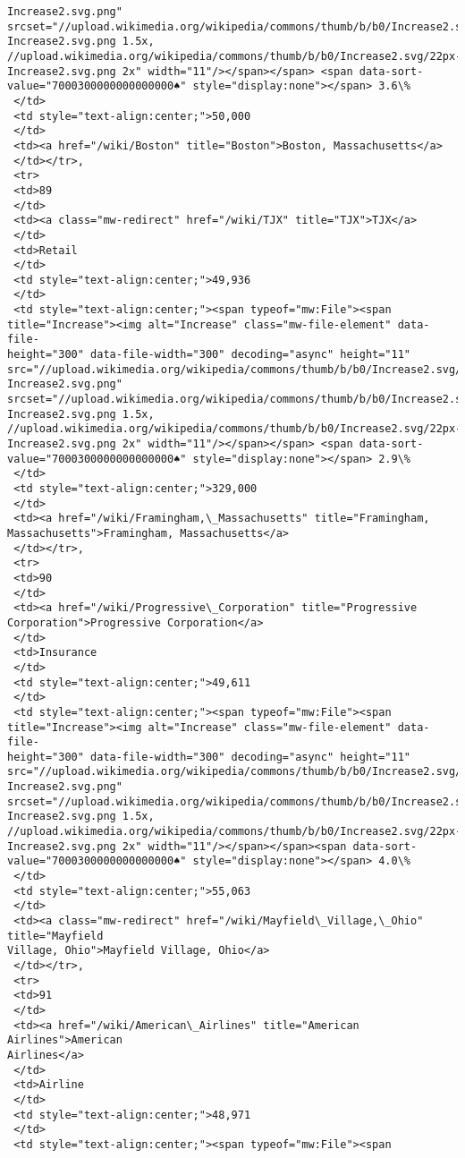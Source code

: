 \documentclass[11pt]{article}
\begin{document}
\begin{tcolorbox}[breakable, size=fbox, boxrule=.5pt, pad at break*=1mm, opacityfill=0]
\begin{Verbatim}[commandchars=\\\{\}]
Increase2.svg.png"
srcset="//upload.wikimedia.org/wikipedia/commons/thumb/b/b0/Increase2.svg/17px-
Increase2.svg.png 1.5x,
//upload.wikimedia.org/wikipedia/commons/thumb/b/b0/Increase2.svg/22px-
Increase2.svg.png 2x" width="11"/></span></span> <span data-sort-
value="7000300000000000000♠" style="display:none"></span> 3.6\%
 </td>
 <td style="text-align:center;">50,000
 </td>
 <td><a href="/wiki/Boston" title="Boston">Boston, Massachusetts</a>
 </td></tr>,
 <tr>
 <td>89
 </td>
 <td><a class="mw-redirect" href="/wiki/TJX" title="TJX">TJX</a>
 </td>
 <td>Retail
 </td>
 <td style="text-align:center;">49,936
 </td>
 <td style="text-align:center;"><span typeof="mw:File"><span
title="Increase"><img alt="Increase" class="mw-file-element" data-file-
height="300" data-file-width="300" decoding="async" height="11"
src="//upload.wikimedia.org/wikipedia/commons/thumb/b/b0/Increase2.svg/11px-
Increase2.svg.png"
srcset="//upload.wikimedia.org/wikipedia/commons/thumb/b/b0/Increase2.svg/17px-
Increase2.svg.png 1.5x,
//upload.wikimedia.org/wikipedia/commons/thumb/b/b0/Increase2.svg/22px-
Increase2.svg.png 2x" width="11"/></span></span> <span data-sort-
value="7000300000000000000♠" style="display:none"></span> 2.9\%
 </td>
 <td style="text-align:center;">329,000
 </td>
 <td><a href="/wiki/Framingham,\_Massachusetts" title="Framingham,
Massachusetts">Framingham, Massachusetts</a>
 </td></tr>,
 <tr>
 <td>90
 </td>
 <td><a href="/wiki/Progressive\_Corporation" title="Progressive
Corporation">Progressive Corporation</a>
 </td>
 <td>Insurance
 </td>
 <td style="text-align:center;">49,611
 </td>
 <td style="text-align:center;"><span typeof="mw:File"><span
title="Increase"><img alt="Increase" class="mw-file-element" data-file-
height="300" data-file-width="300" decoding="async" height="11"
src="//upload.wikimedia.org/wikipedia/commons/thumb/b/b0/Increase2.svg/11px-
Increase2.svg.png"
srcset="//upload.wikimedia.org/wikipedia/commons/thumb/b/b0/Increase2.svg/17px-
Increase2.svg.png 1.5x,
//upload.wikimedia.org/wikipedia/commons/thumb/b/b0/Increase2.svg/22px-
Increase2.svg.png 2x" width="11"/></span></span><span data-sort-
value="7000300000000000000♠" style="display:none"></span> 4.0\%
 </td>
 <td style="text-align:center;">55,063
 </td>
 <td><a class="mw-redirect" href="/wiki/Mayfield\_Village,\_Ohio" title="Mayfield
Village, Ohio">Mayfield Village, Ohio</a>
 </td></tr>,
 <tr>
 <td>91
 </td>
 <td><a href="/wiki/American\_Airlines" title="American Airlines">American
Airlines</a>
 </td>
 <td>Airline
 </td>
 <td style="text-align:center;">48,971
 </td>
 <td style="text-align:center;"><span typeof="mw:File"><span

\end{Verbatim}
\end{tcolorbox}
\end{document}
